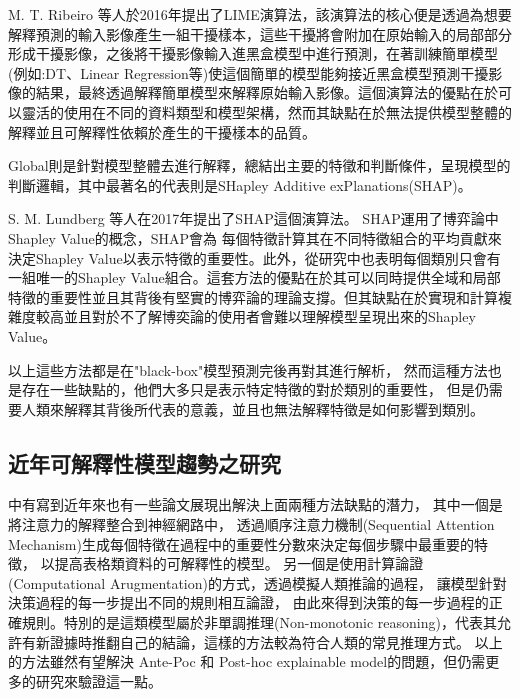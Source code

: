 \documentclass[class=NCU_thesis, crop=false]{standalone}
\begin{document}
M. T. Ribeiro 等人於2016年提出了LIME演算法\cite{10.1145/2939672.2939778}，該演算法的核心便是透過為想要解釋預測的輸入影像產生一組干擾樣本，這些干擾將會附加在原始輸入的局部部分形成干擾影像，之後將干擾影像輸入進黑盒模型中進行預測，在著訓練簡單模型(例如:DT、Linear Regression等)使這個簡單的模型能夠接近黑盒模型預測干擾影像的結果，最終透過解釋簡單模型來解釋原始輸入影像。這個演算法的優點在於可以靈活的使用在不同的資料類型和模型架構，然而其缺點在於無法提供模型整體的解釋並且可解釋性依賴於產生的干擾樣本的品質。

Global則是針對模型整體去進行解釋，總結出主要的特徵和判斷條件，呈現模型的判斷邏輯，其中最著名的代表則是SHapley Additive exPlanations(SHAP)\cite{NIPS2017_8a20a862}。

S. M. Lundberg 等人在2017年提出了SHAP這個演算法\cite{NIPS2017_8a20a862}。 SHAP運用了博弈論中Shapley Value的概念，SHAP會為
每個特徵計算其在不同特徵組合的平均貢獻來決定Shapley Value以表示特徵的重要性。此外，從研究中也表明每個類別只會有一組唯一的Shapley Value組合。這套方法的優點在於其可以同時提供全域和局部特徵的重要性並且其背後有堅實的博弈論的理論支撐。但其缺點在於實現和計算複雜度較高並且對於不了解博奕論的使用者會難以理解模型呈現出來的Shapley Value。

以上這些方法都是在"black-box"模型預測完後再對其進行解析，
然而這種方法也是存在一些缺點的，他們大多只是表示特定特徵的對於類別的重要性，
但是仍需要人類來解釋其背後所代表的意義，並且也無法解釋特徵是如何影響到類別。

\subsection{近年可解釋性模型趨勢之研究}
\cite{LONGO2024102301}中有寫到近年來也有一些論文展現出解決上面兩種方法缺點的潛力，
其中一個是將注意力的解釋整合到神經網路中，
透過順序注意力機制(Sequential Attention Mechanism)生成每個特徵在過程中的重要性分數來決定每個步驟中最重要的特徵，
以提高表格類資料的可解釋性的模型\cite{Arik_Pfister_2021}。
另一個是使用計算論證(Computational Arugmentation)的方式\cite{ijcai2021p600}，透過模擬人類推論的過程，
讓模型針對決策過程的每一步提出不同的規則相互論證，
由此來得到決策的每一步過程的正確規則。特別的是這類模型屬於非單調推理(Non-monotonic reasoning)，代表其允許有新證據時推翻自己的結論，這樣的方法較為符合人類的常見推理方式。
以上的方法雖然有望解決 Ante-Poc 和 Post-hoc explainable model的問題，但仍需更多的研究來驗證這一點。
\end{document}
